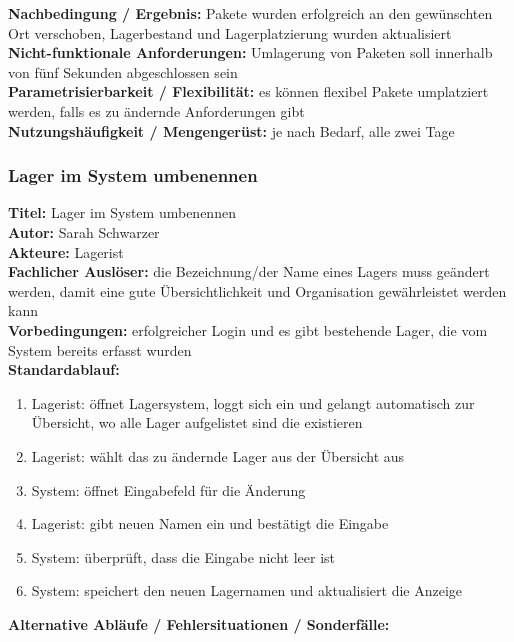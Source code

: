 \textbf{Nachbedingung / Ergebnis:} Pakete wurden erfolgreich an den gewünschten Ort verschoben, Lagerbestand und Lagerplatzierung wurden aktualisiert\\
\textbf{Nicht-funktionale Anforderungen:} Umlagerung von Paketen soll innerhalb von fünf Sekunden abgeschlossen sein\\
\textbf{Parametrisierbarkeit / Flexibilität:} es können flexibel Pakete umplatziert werden, falls es zu ändernde Anforderungen gibt\\
\textbf{Nutzungshäufigkeit / Mengengerüst:} je nach Bedarf, alle zwei Tage

\subsubsection{Lager im System umbenennen}
\textbf{Titel:} Lager im System umbenennen\\
\textbf{Autor:} Sarah Schwarzer\\
\textbf{Akteure:} Lagerist\\
\textbf{Fachlicher Auslöser:} die Bezeichnung/der Name eines Lagers muss geändert werden, damit eine gute Übersichtlichkeit und Organisation gewährleistet werden kann\\
\textbf{Vorbedingungen:} erfolgreicher Login und es gibt bestehende Lager, die vom System bereits erfasst wurden\\
\textbf{Standardablauf:}
\begin{enumerate}
    \item Lagerist: öffnet Lagersystem, loggt sich ein und gelangt automatisch zur Übersicht, wo alle Lager aufgelistet sind die existieren\\
    \item Lagerist: wählt das zu ändernde Lager aus der Übersicht aus\\
    \item System: öffnet Eingabefeld für die Änderung\\
    \item Lagerist: gibt neuen Namen ein und bestätigt die Eingabe\\
    \item System: überprüft, dass die Eingabe nicht leer ist\\
    \item System: speichert den neuen Lagernamen und aktualisiert die Anzeige\\
\end{enumerate}
\textbf{Alternative Abläufe / Fehlersituationen / Sonderfälle:}
